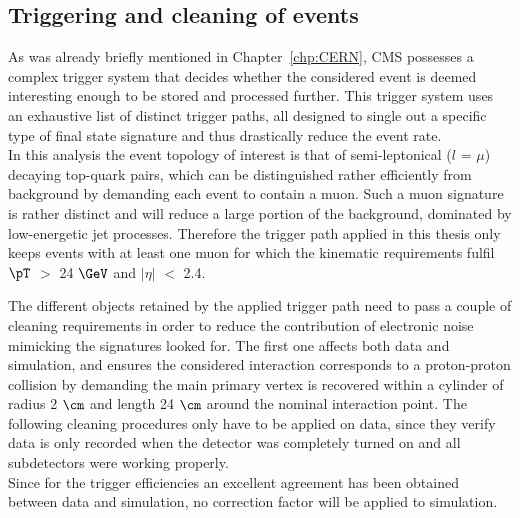 \subsection{Triggering and cleaning of events}\label{subsec::Trigger}
As was already briefly mentioned in Chapter~\ref{chp:CERN}, CMS possesses a complex trigger system that decides whether the considered event is deemed interesting enough to be stored and processed further.
This trigger system uses an exhaustive list of distinct trigger paths, all designed to single out a specific type of final state signature and thus drastically reduce the event rate.
\\

In this analysis the event topology of interest is that of semi-leptonical ($l$ = $\mu$) decaying top-quark pairs, which can be distinguished rather efficiently from background by demanding each event to contain a muon. Such a muon signature is rather distinct and will reduce a large portion of the background, dominated by low-energetic jet processes.
Therefore the trigger path applied in this thesis only keeps events with at least one muon for which the kinematic requirements fulfil $\pT$ $>$ 24 $\GeV$ and $\vert \eta \vert$ $<$ 2.4.

The different objects retained by the applied trigger path need to pass a couple of cleaning requirements in order to reduce the contribution of electronic noise mimicking the signatures looked for.
The first one affects both data and simulation, and ensures the considered interaction corresponds to a proton-proton collision by demanding the main primary vertex is recovered within a cylinder of radius 2 $\cm$ and length 24 $\cm$ around the nominal interaction point.
The following cleaning procedures only have to be applied on data, since they verify data is only recorded when the detector was completely turned on and all subdetectors were working properly.
\\

Since for the trigger efficiencies an excellent agreement has been obtained between data and simulation, no correction factor will be applied to simulation.%

